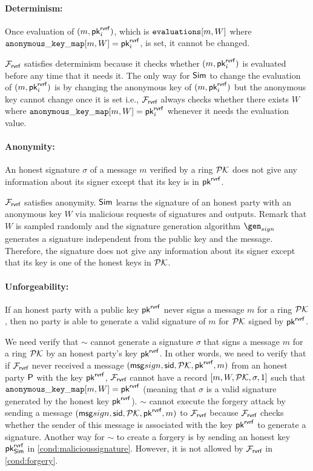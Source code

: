 \paragraph{Determinism:} Once evaluation of $ (m, \mathsf{pk}^{\mathsf{rvrf}}_i) $, which is $ \texttt{evaluations}[m,W] $ where $ \mathtt{anonymous\_key\_map}[m,W] = \mathsf{pk}^{\mathsf{rvrf}}_i $, is set, it cannot be changed. 

$ \mathcal{F}_{\textsf{rvrf}} $ satisfies determinism because it checks whether $ (m, \mathsf{pk}^{\mathsf{rvrf}}_i) $ is evaluated before any time that it needs it. The only way for $ \mathsf{Sim} $ to change the evaluation of $ (m, \mathsf{pk}^{\mathsf{rvrf}}_i) $ is by changing the anonymous key of $ (m, \mathsf{pk}^{\mathsf{rvrf}}_i)  $ but the anonymous key cannot change once it is set i.e., $ \mathcal{F}_{\textsf{rvrf}} $ always checks whether there exists $ W $ where $ \mathtt{anonymous\_key\_map}[m,W]  = \mathsf{pk}^{\mathsf{rvrf}}_i$ whenever it needs the evaluation value.

\paragraph{Anonymity:} An honest signature $ \sigma $ of a message $ m $ verified by a ring $ {\mathcal{PK}} $ does not give any information about its signer except that its key is in $ \mathsf{pk}^{\mathsf{rvrf}} $.

$ \mathcal{F}_{\textsf{rvrf}} $ satisfies anonymity. $ \mathsf{Sim} $ learns the signature of an honest party with an anonymous key $ W $ via malicious requests of signatures and outputs. Remark that $ W $ is sampled randomly and the signature generation algorithm $ \gen_{sign} $ generates a signature independent from the public key and the message. Therefore, the signature does not give any information about its signer except that its key is one of the honest keys in  $ {\mathcal{PK}}  $.

\paragraph{Unforgeability:}  If an honest party with a public key $ \mathsf{pk}^{\mathsf{rvrf}} $ never signs a message $ m $ for a ring $ {\mathcal{PK}} $, then no party is able to generate a valid signature of $ m $ for $ {\mathcal{PK}} $ signed by $ \mathsf{pk}^{\mathsf{rvrf}} $. 

We need verify that $ \sim $ cannot generate a signature $ \sigma $ that signs a message $ m $ for a ring $ {\mathcal{PK}} $ by an honest party's key $ \mathsf{pk}^{\mathsf{rvrf}} $. In other words, we need to verify that if $ \mathcal{F}_{\textsf{rvrf}} $ never received a message $ (\mathsf{msg}{sign}, \textsf{sid},{\mathcal{PK}},\mathsf{pk}^{\mathsf{rvrf}},m) $ from an honest party $ \mathsf{P} $ with the key $ \mathsf{pk}^{\mathsf{rvrf}} $, $ \mathcal{F}_{\textsf{rvrf}} $ cannot have a record $ [m, W, {\mathcal{PK}}, \sigma, 1] $ such that $ \mathtt{anonymous\_key\_map}[m,W]  = \mathsf{pk}^{\mathsf{rvrf}}$ (meaning that $ \sigma $ is a valid signature generated by the honest key $ \mathsf{pk}^{\mathsf{rvrf}} $). 
$ \sim $ cannot execute the forgery attack by sending a message $ (\mathsf{msg}{sign}, \textsf{sid},{\mathcal{PK}},\mathsf{pk}^{\mathsf{rvrf}},m) $ to $ \mathcal{F}_{\textsf{rvrf}} $ because $ \mathcal{F}_{\textsf{rvrf}} $ checks whether the sender of this message is associated with the key $ \mathsf{pk}^{\mathsf{rvrf}} $ to generate a signature. Another way for $ \sim $ to create a forgery is by sending an honest key $ \mathsf{pk}^{\mathsf{rvrf}}_{\mathsf{Sim}} $  in \ref{cond:malicioussignature}. However, it is not allowed by $ \mathcal{F}_{\textsf{rvrf}} $ in \ref{cond:forgery}.


